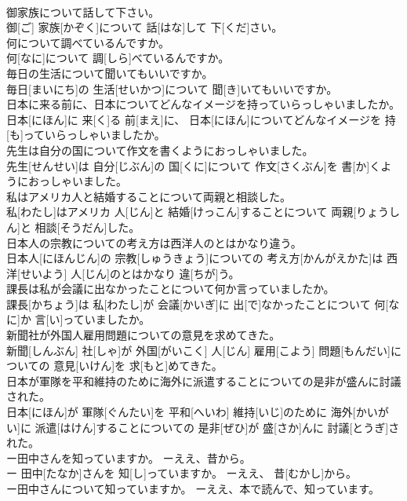 \documentclass[8pt]{extreport}
\begin{document}
\begin{CJK}{UTF8}{min}
\\	御家族について話して下さい。	
\\	御[ご] 家族[かぞく]について 話[はな]して 下[くだ]さい。
\\	何について調べているんですか。	
\\	何[なに]について 調[しら]べているんですか。
\\	毎日の生活について聞いてもいいですか。	
\\	毎日[まいにち]の 生活[せいかつ]について 聞[き]いてもいいですか。
\\	日本に来る前に、日本についてどんなイメージを持っていらっしゃいましたか。	
\\	日本[にほん]に 来[く]る 前[まえ]に、 日本[にほん]についてどんなイメージを 持[も]っていらっしゃいましたか。
\\	先生は自分の国について作文を書くようにおっしゃいました。	
\\	先生[せんせい]は 自分[じぶん]の 国[くに]について 作文[さくぶん]を 書[か]くようにおっしゃいました。
\\	私はアメリカ人と結婚することについて両親と相談した。	
\\	私[わたし]はアメリカ 人[じん]と 結婚[けっこん]することについて 両親[りょうしん]と 相談[そうだん]した。
\\	日本人の宗教についての考え方は西洋人のとはかなり違う。	
\\	日本人[にほんじん]の 宗教[しゅうきょう]についての 考え方[かんがえかた]は 西洋[せいよう] 人[じん]のとはかなり 違[ちが]う。
\\	課長は私が会議に出なかったことについて何か言っていましたか。	
\\	課長[かちょう]は 私[わたし]が 会議[かいぎ]に 出[で]なかったことについて 何[なに]か 言[い]っていましたか。
\\	新聞社が外国人雇用問題についての意見を求めてきた。	
\\	新聞[しんぶん] 社[しゃ]が 外国[がいこく] 人[じん] 雇用[こよう] 問題[もんだい]についての 意見[いけん]を 求[もと]めてきた。
\\	日本が軍隊を平和維持のために海外に派遣することについての是非が盛んに討議された。	
\\	日本[にほん]が 軍隊[ぐんたい]を 平和[へいわ] 維持[いじ]のために 海外[かいがい]に 派遣[はけん]することについての 是非[ぜひ]が 盛[さか]んに 討議[とうぎ]された。
\\	ー田中さんを知っていますか。 ーええ、昔から。	
\\	ー 田中[たなか]さんを 知[し]っていますか。 ーええ、 昔[むかし]から。
\\	ー田中さんについて知っていますか。 ーええ、本で読んで、知っています。	

\end{CJK}
\end{document}
